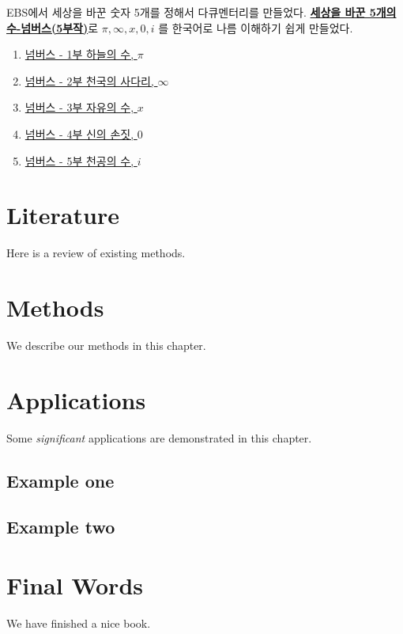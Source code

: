 \documentclass[
]{book}
\providecommand{\tightlist}{%
  \setlength{\itemsep}{0pt}\setlength{\parskip}{0pt}}
\begin{document}
EBS에서 세상을 바꾼 숫자 5개를 정해서 다큐멘터리를 만들었다. \textbf{\href{http://home.ebs.co.kr/docuprime/newReleaseView/297?c.page=1}{세상을 바꾼 5개의 수-넘버스(5부작)}}로 \(\pi, \infty, x, 0, i\) 를 한국어로 나름 이해하기 쉽게 만들었다.

\begin{enumerate}
\def\labelenumi{\arabic{enumi}.}
\tightlist
\item
  \href{http://www.ebs.co.kr/tv/show?prodId=348\&lectId=10400921}{넘버스 - 1부 하늘의 수, \(\pi\)}
\item
  \href{http://www.ebs.co.kr/tv/show?prodId=348\&lectId=10401181}{넘버스 - 2부 천국의 사다리, \(\infty\)}
\item
  \href{http://www.ebs.co.kr/tv/show?prodId=348\&lectId=10402446}{넘버스 - 3부 자유의 수, \(x\)}
\item
  \href{http://www.ebs.co.kr/tv/show?prodId=348\&lectId=10404094}{넘버스 - 4부 신의 손짓, \(0\)}
\item
  \href{http://www.ebs.co.kr/tv/show?prodId=348\&lectId=10404366}{넘버스 - 5부 천공의 수, \(i\)}
\end{enumerate}

\hypertarget{literature}{%
\chapter{Literature}\label{literature}}

Here is a review of existing methods.

\hypertarget{methods}{%
\chapter{Methods}\label{methods}}

We describe our methods in this chapter.

\hypertarget{applications}{%
\chapter{Applications}\label{applications}}

Some \emph{significant} applications are demonstrated in this chapter.

\hypertarget{example-one}{%
\section{Example one}\label{example-one}}

\hypertarget{example-two}{%
\section{Example two}\label{example-two}}

\hypertarget{final-words}{%
\chapter{Final Words}\label{final-words}}

We have finished a nice book.

  
\end{document}

